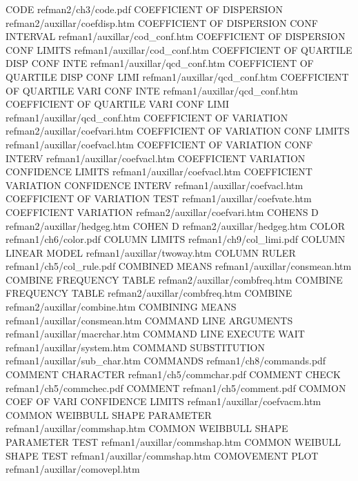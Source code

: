 CODE                                    refman2/ch3/code.pdf
COEFFICIENT OF DISPERSION               refman2/auxillar/coefdisp.htm
COEFFICIENT OF DISPERSION CONF INTERVAL refman1/auxillar/cod_conf.htm
COEFFICIENT OF DISPERSION CONF LIMITS   refman1/auxillar/cod_conf.htm
COEFFICIENT OF QUARTILE DISP CONF INTE  refman1/auxillar/qcd_conf.htm
COEFFICIENT OF QUARTILE DISP CONF LIMI  refman1/auxillar/qcd_conf.htm
COEFFICIENT OF QUARTILE VARI CONF INTE  refman1/auxillar/qcd_conf.htm
COEFFICIENT OF QUARTILE VARI CONF LIMI  refman1/auxillar/qcd_conf.htm
COEFFICIENT OF VARIATION                refman2/auxillar/coefvari.htm
COEFFICIENT OF VARIATION CONF LIMITS    refman1/auxillar/coefvacl.htm
COEFFICIENT OF VARIATION CONF INTERV    refman1/auxillar/coefvacl.htm
COEFFICIENT VARIATION CONFIDENCE LIMITS refman1/auxillar/coefvacl.htm
COEFFICIENT VARIATION CONFIDENCE INTERV refman1/auxillar/coefvacl.htm
COEFFICIENT OF VARIATION TEST           refman1/auxillar/coefvate.htm
COEFFICIENT VARIATION                   refman2/auxillar/coefvari.htm
COHENS D                                refman2/auxillar/hedgeg.htm
COHEN D                                 refman2/auxillar/hedgeg.htm
COLOR                                   refman1/ch6/color.pdf
COLUMN LIMITS                           refman1/ch9/col_limi.pdf
COLUMN LINEAR MODEL                     refman1/auxillar/twoway.htm
COLUMN RULER                            refman1/ch5/col_rule.pdf
COMBINED MEANS                          refman1/auxillar/consmean.htm
COMBINE FREQUENCY TABLE                 refman2/auxillar/combfreq.htm
COMBINE FREQUENCY TABLE                 refman2/auxillar/combfreq.htm
COMBINE                                 refman2/auxillar/combine.htm
COMBINING MEANS                         refman1/auxillar/consmean.htm
COMMAND LINE ARGUMENTS                  refman1/auxillar/macrchar.htm
COMMAND LINE EXECUTE WAIT               refman1/auxillar/system.htm
COMMAND SUBSTITUTION                    refman1/auxillar/sub_char.htm
COMMANDS                                refman1/ch8/commands.pdf
COMMENT CHARACTER                       refman1/ch5/commchar.pdf
COMMENT CHECK                           refman1/ch5/commchec.pdf
COMMENT                                 refman1/ch5/comment.pdf
COMMON COEF OF VARI CONFIDENCE LIMITS   refman1/auxillar/coefvacm.htm
COMMON WEIBBULL SHAPE PARAMETER         refman1/auxillar/commshap.htm
COMMON WEIBBULL SHAPE PARAMETER TEST    refman1/auxillar/commshap.htm
COMMON WEIBULL SHAPE TEST               refman1/auxillar/commshap.htm
COMOVEMENT PLOT                         refman1/auxillar/comovepl.htm
